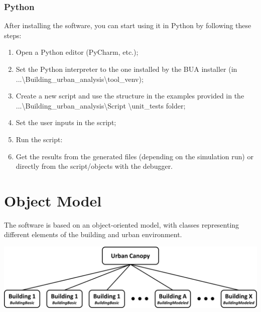 \documentclass[a4paper,12pt]{article} %
\begin{document}
    \subsubsection{Python}
    \label{subsubsec:quick-start-guide-python}
    After installing the software, you can start using it in Python by following these steps:
    \begin{enumerate}
        \item Open a Python editor (PyCharm, etc.);
        \item Set the Python interpreter to the one installed by the BUA installer (in ...\textbackslash Building\_urban\_analysis\textbackslash tool\_venv);
        \item Create a new script and use the structure in the examples provided in the ...\textbackslash Building\_urban\_analysis\textbackslash Script \textbackslash unit\_tests folder;
        \item Set the user inputs in the script;
        \item Run the script:
        \item Get the results from the generated files (depending on the simulation run) or directly from the script/objects with the debugger.
    \end{enumerate}


    \section{Object Model}
    \label{sec:object-model}
    The software is based on an object-oriented model, with classes representing different elements of the building and urban environment.

    \begin{center}
        \captionsetup{justification=centering} %
        \includegraphics[width=15cm]{Figures/Objects.png}%
        \label{fig SimulationObj}
    \end{center}
\end{document}
